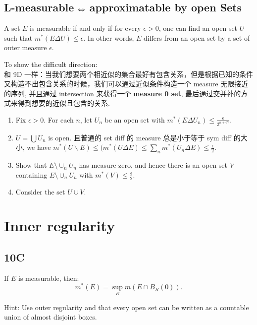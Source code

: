 \documentclass[lang=cn,11pt]{template}
\begin{document}
\subsection{L-measurable $\Leftrightarrow$ approximatable by open Sets}
\begin{theorem}
    A set \( E \) is measurable if and only if for every \( \epsilon > 0 \), one can find an open set \( U \) such that \( m^*(E \Delta U) \leq \epsilon \). In other words, \( E \) differs from an open set by a set of outer measure \( \epsilon \).
\end{theorem}


\begin{remark}
To show the difficult direction:\\
和 9D 一样：当我们想要两个相近似的集合最好有包含关系，但是根据已知的条件又构造不出包含关系的时候，我们可以通过近似条件构造一个 measure 无限接近的序列, 并且通过 intersection 来获得一个 \textbf{measure 0 set}, 最后通过交并补的方式来得到想要的近似且包含的关系.
\begin{enumerate}
    \item Fix \( \epsilon > 0 \). For each \( n \), let \( U_n \) be an open set with \( m^*(E \Delta U_n) \leq \frac{\epsilon}{2^{n+67}} \).
    \item \( U = \bigcup U_n \) is open. 且普通的 set diff 的 measure 总是小于等于 sym diff 的大小, we have \( m^*(U \backslash E) \leq ( m^*(U \Delta E)  \leq \sum_n m^*(U_n \Delta E) \leq \frac{\epsilon}{2} \).
    \item Show that \( E \setminus \cup_n U_n \) has measure zero, and hence there is an open set \( V \) containing \( E \setminus \cup_n U_n \) with \( m^*(V) \leq \frac{\epsilon}{2} \).
    \item Consider the set \( U \cup V \).
\end{enumerate}
\end{remark}

\section{Inner regularity}
\subsection*{10C}
If \( E \) is measurable, then:
\[
m^*(E) = \sup_R m(E \cap B_R(0)).
\]

\begin{remark}
Hint: Use outer regularity and that every open set can be written as a countable union of almost disjoint boxes.
\end{remark}
\end{document}
